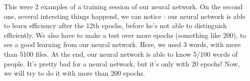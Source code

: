 \documentclass[12pt]{article}
\begin{document}
This were 2 examples of a training session of our neural network. On the second one, several intersting things happend, we can notice : our neural network is able to learn efficiency after the 12th epochs, before he's not able to distinguish efficiently. We also have to make a test over more epochs (something like 200), to see a good learning from our neural network. 
Here, we used 3 words, with more than 5100 files. At the end, our neural network is able to know 5/100 words of people. It's pretty bad for a neural network, but it's only with 20 epochs! 
Now, we will try to do it with more than 200 epochs.




\end{document}
